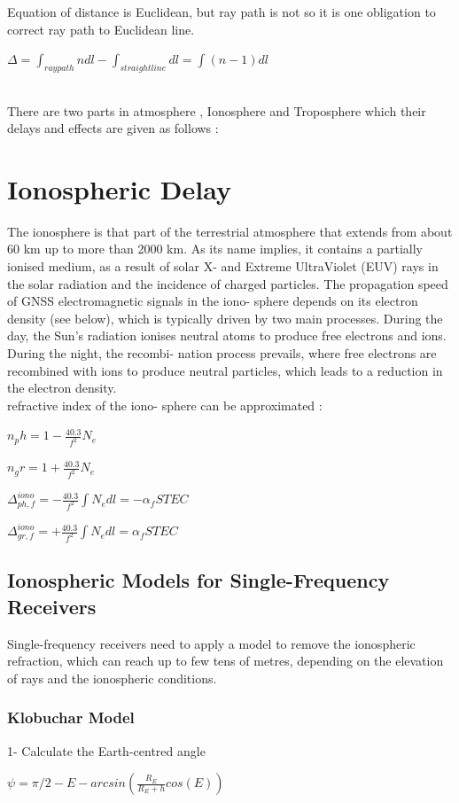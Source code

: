 \documentclass[12pt]{article}
\begin{document}
\newpage
Equation of distance is Euclidean, but ray path is not so it is one obligation to correct ray path to Euclidean line. \\
\centerline {$\Delta = \int_{ray path} n dl - \int_{straight line}dl = \int (n-1)dl$}\\
There are two parts in atmosphere , Ionosphere and Troposphere which their delays and effects are given as follows : \\ 
\section{Ionospheric Delay}
The ionosphere is that part of the terrestrial atmosphere that extends from
about 60 km up to more than 2000 km. As its name implies, it contains a
partially ionised medium, as a result of solar X- and Extreme UltraViolet
(EUV) rays in the solar radiation and the incidence of charged particles.
The propagation speed of GNSS electromagnetic signals in the iono-
sphere depends on its electron density (see below), which is typically driven
by two main processes. During the day, the Sun’s radiation ionises neutral
atoms to produce free electrons and ions. During the night, the recombi-
nation process prevails, where free electrons are recombined with ions to
produce neutral particles, which leads to a reduction in the electron density.\\
refractive index of the iono-
sphere can be approximated : \\
\centerline{$n_ph = 1-\frac{40.3}{f^2}N_e$}
\centerline{$n_gr = 1+\frac{40.3}{f^2}N_e$}
\centerline{$\Delta^{iono}_{ph,f} = -\frac{40.3}{f^2}\int N_e dl = -\alpha_f STEC$}
\centerline{$\Delta^{iono}_{gr,f} = +\frac{40.3}{f^2}\int N_e dl = \alpha_f STEC$}
\subsection{Ionospheric Models for Single-Frequency Receivers}
Single-frequency receivers need to apply a model to remove the ionospheric
refraction, which can reach up to few tens of metres, depending on the
elevation of rays and the ionospheric conditions.
\subsubsection{Klobuchar Model}
1- Calculate the Earth-centred angle \\
\centerline{$\psi = \pi/2 -E -arcsin(\frac{R_E}{R_E+h}cos(E))$}\\
\end{document}
